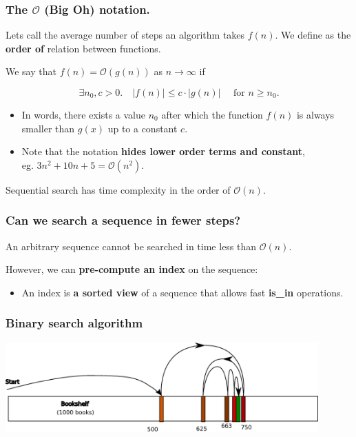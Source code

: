 \documentclass{beamer} %
\newcommand\emc[1]{\textcolor{midred}{\textbf{#1}}}
\begin{document}
\begin{frame}
\frametitle{The $\mathcal{O}$ (Big Oh) notation.}

Lets call the average number of steps an algorithm takes $f(n)$. We define as the \emc{order of} relation between functions.

\vspace{3mm}
We say that $f(n) = \mathcal{O}(g(n))$ as $n \rightarrow \infty$ if

\[ \exists n_0, c > 0. \quad |f(n)| \leq c \cdot |g(n)| \quad \text{ for } n \geq n_0. \]

\begin{itemize}
\item In words, there exists a value $n_0$ after which the function $f(n)$ is always smaller than $g(x)$ up to a constant $c$.
\item Note that the notation \emc{hides lower order terms and constant}, \\ eg. $3n^2 + 10n + 5 = \mathcal{O}(n^2)$.
\end{itemize}

\begin{block}{}
Sequential search has time complexity in the order of $\mathcal{O}(n).$
\end{block}

\end{frame}


\begin{frame}
\frametitle{Can we search a sequence in fewer steps?}

An arbitrary sequence cannot be searched in time less than $\mathcal{O}(n)$.

\vspace{3mm}
However, we can \emc{pre-compute an index} on the sequence:
\begin{itemize}
	\item An index is \emc{a sorted view} of a sequence that allows fast \emc{is\_in} operations.
\end{itemize}

\end{frame}


\begin{frame}
  \frametitle{Binary search algorithm}
  \includegraphics[width=120mm]{assets/bookshelf.pdf}
\end{frame}
\end{document}
